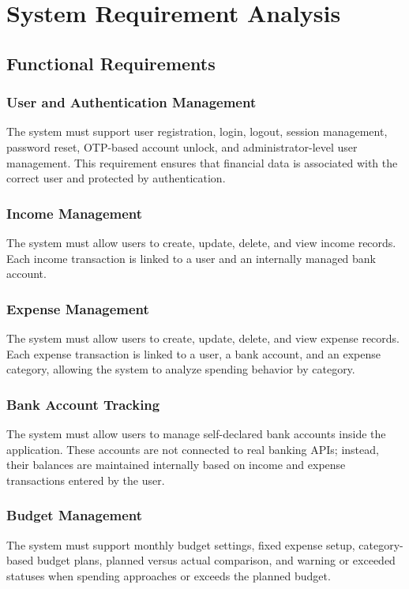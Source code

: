 ﻿\documentclass{article}
\begin{document}
\section{ System Requirement Analysis}
\subsection{Functional Requirements}

\subsubsection{User and Authentication Management}
The system must support user registration, login, logout, session management, password reset, OTP-based account unlock, and administrator-level user management. This requirement ensures that financial data is associated with the correct user and protected by authentication.

\subsubsection{Income Management}
The system must allow users to create, update, delete, and view income records. Each income transaction is linked to a user and an internally managed bank account.

\subsubsection{Expense Management}
The system must allow users to create, update, delete, and view expense records. Each expense transaction is linked to a user, a bank account, and an expense category, allowing the system to analyze spending behavior by category.

\subsubsection{Bank Account Tracking}
The system must allow users to manage self-declared bank accounts inside the application. These accounts are not connected to real banking APIs; instead, their balances are maintained internally based on income and expense transactions entered by the user.

\subsubsection{Budget Management}
The system must support monthly budget settings, fixed expense setup, category-based budget plans, planned versus actual comparison, and warning or exceeded statuses when spending approaches or exceeds the planned budget.
\end{document}
